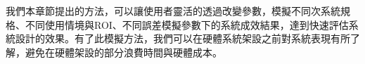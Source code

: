 我們本章節提出的方法，可以讓使用者靈活的透過改變參數，模擬不同次系統規格、不同使用情境與ROI、不同誤差模擬參數下的系統成效結果，達到快速評估系統設計的效果。有了此模擬方法，我們可以在硬體系統架設之前對系統表現有所了解，避免在硬體架設的部分浪費時間與硬體成本。




































